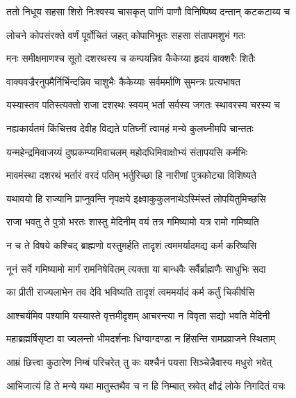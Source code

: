 
\twolineshloka
{ततो निधूय सहसा शिरो निःश्वस्य चासकृत्}
{पाणिं पाणौ विनिष्पिष्य दन्तान् कटकटाय्य च} %

\twolineshloka
{लोचने कोपसंरक्ते वर्णं पूर्वोचितं जहत्}
{कोपाभिभूतः सहसा संतापमशुभं गतः} %

\twolineshloka
{मनः समीक्षमाणश्च सूतो दशरथस्य च}
{कम्पयन्निव कैकेय्या हृदयं वाक्शरैः शितैः} %

\twolineshloka
{वाक्यवज्रैरनुपमैर्निर्भिन्दन्निव चाशुभैः}
{कैकेय्याः सर्वमर्माणि सुमन्त्रः प्रत्यभाषत} %

\twolineshloka
{यस्यास्तव पतिस्त्यक्तो राजा दशरथः स्वयम्}
{भर्ता सर्वस्य जगतः स्थावरस्य चरस्य च} %

\twolineshloka
{नह्यकार्यतमं किंचित्तव देवीह विद्यते}
{पतिघ्नीं त्वामहं मन्ये कुलघ्नीमपि चान्ततः} %

\twolineshloka
{यन्महेन्द्रमिवाजय्यं दुष्प्रकम्प्यमिवाचलम्}
{महोदधिमिवाक्षोभ्यं संतापयसि कर्मभिः} %

\twolineshloka
{मावमंस्था दशरथं भर्तारं वरदं पतिम्}
{भर्तुरिच्छा हि नारीणां पुत्रकोट्या विशिष्यते} %

\twolineshloka
{यथावयो हि राज्यानि प्राप्नुवन्ति नृपक्षये}
{इक्ष्वाकुकुलनाथेऽस्मिंस्तं लोपयितुमिच्छसि} %

\twolineshloka
{राजा भवतु ते पुत्रो भरतः शास्तु मेदिनीम्}
{वयं तत्र गमिष्यामो यत्र रामो गमिष्यति} %

\twolineshloka
{न च ते विषये कश्चिद् ब्राह्मणो वस्तुमर्हति}
{तादृशं त्वममर्यादमद्य कर्म करिष्यसि} %

\twolineshloka
{नूनं सर्वे गमिष्यामो मार्गं रामनिषेवितम्}
{त्यक्ता या बान्धवैः सर्वैर्ब्राह्मणैः साधुभिः सदा} %

\twolineshloka
{का प्रीती राज्यलाभेन तव देवि भविष्यति}
{तादृशं त्वममर्यादं कर्म कर्तुं चिकीर्षसि} %

\twolineshloka
{आश्चर्यमिव पश्यामि यस्यास्ते वृत्तमीदृशम्}
{आचरन्त्या न विवृता सद्यो भवति मेदिनी} %

\twolineshloka
{महाब्रह्मर्षिसृष्टा वा ज्वलन्तो भीमदर्शनाः}
{धिग्वाग्दण्डा न हिंसन्ति रामप्रव्राजने स्थिताम्} %

\twolineshloka
{आम्रं छित्त्वा कुठारेण निम्बं परिचरेत् तु कः}
{यश्चैनं पयसा सिञ्चेन्नैवास्य मधुरो भवेत्} %

\twolineshloka
{आभिजात्यं हि ते मन्ये यथा मातुस्तथैव च}
{न हि निम्बात् स्रवेत् क्षौद्रं लोके निगदितं वचः} %

